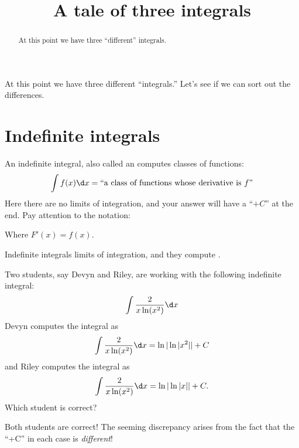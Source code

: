 \documentclass{ximera}
\title[Dig-In:]{A tale of three integrals}
\begin{document}
\begin{abstract}
  At this point we have three ``different'' integrals. 
\end{abstract}
\maketitle

At this point we have three different ``integrals.'' Let's see if we
can sort out the differences.

\section{Indefinite integrals}

An indefinite integral, also called an  computes
classes of functions:
\[
\int f(x) \d x = \text{``a class of functions whose derivative is $f$''}
\]
Here there are no limits of integration, and your answer will have a
``$+C$'' at the end. Pay attention to the notation:
\begin{image}
\end{image}
Where $F'(x) = f(x)$.
\begin{explanation}%
  Indefinite integrals
   limits of
  integration, and they compute .
\end{explanation}

\begin{question}
  Two students, say Devyn and Riley, are working with the following
  indefinite integral:
  \[
  \int \frac{2}{x\ln(x^2)}\d x
  \]
  Devyn computes the integral as
  \[
  \int \frac{2}{x\ln(x^2)}\d x = \ln|\ln|x^2|| + C
  \]
  and Riley computes the integral as
  \[
  \int \frac{2}{x\ln(x^2)}\d x = \ln|\ln|x|| + C.
  \]
  Which student is correct?
  \begin{multipleChoice}
  \end{multipleChoice}
  \begin{feedback}
    Both students are correct! The seeming discrepancy arises from the
    fact that the ``+C'' in each case is \textit{different}!
  \end{feedback}
\end{question}
\end{document}
